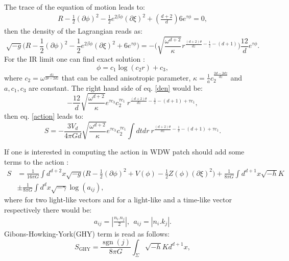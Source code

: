\documentclass[]{article}
\DeclareMathOperator{\sgn}{sgn}
\begin{document}
The trace of the equation of motion leads to:
\begin{align}
R-\frac{1}{2}(\partial \phi)^2-\frac{1}{2}e^{2\beta \phi}(\partial \xi)^2+(\frac{d+2}{d})6e^{\tau \phi}=0,
\end{align}
then the density of the Lagrangian reads as:
\begin{equation}
\sqrt{-g}\Big(R-\frac{1}{2}(\partial \phi)^2-\frac{1}{2}e^{2\beta \phi}(\partial \xi)^2+6e^{\tau \phi}\Big)=-\Big(\sqrt{\frac{\omega^{d+2}}{\kappa}}r^{\frac{(d+2)\theta}{dz}-\frac{1}{z}-(d+1)}\Big)\frac{12}{d}e^{\tau \phi}. \label{den}
\end{equation}
For the IR limit one can find exact solution \cite{strong}:
\begin{equation}
\phi=c_1 \log (c_2 r)+c_3, \label{dilaton}
\end{equation}
where $c_2=\omega^{\frac{dz}{2\theta-2dz}}$ that can be called anisotropic parameter, $\kappa=\frac{1}{a}c_2^{\frac{2d-2dz}{dz}}$ and $a,c_1,c_3$ are constant. The right hand side of eq. \eqref{den} would be:
\begin{equation}
-\frac{12}{d}\sqrt{\frac{\omega^{d+2}}{\kappa}}e^{\tau c_3} c_2^{\tau c_1}~ r^{\frac{(d+2)\theta}{dz}-\frac{1}{z}-(d+1)+\tau c_1},
\end{equation}
then eq. \eqref{action} leads to:
\begin{equation}
S=-\frac{3V_d}{4\pi Gd}\sqrt{\frac{\omega^{d+2}}{\kappa}}e^{\tau c_3} c_2^{\tau c_1} \int  dt dr~ r^{\frac{(d+2)\theta}{dz}-\frac{1}{z}-(d+1)+\tau c_1}. \label{reform}
\end{equation}

If one is interested in computing the action in WDW patch should add some terms to the action \cite{pad,myersnul}:
\begin{equation}
\begin{aligned}
S&=\frac{1}{16\pi G}\int d^{d+2}x \sqrt{-g}\Big(R-\frac{1}{2}(\partial \phi)^2+V(\phi)-\frac{1}{2}Z(\phi)(\partial \xi)^2\Big)+\frac{1}{8\pi G}\int d^{d+1}x \sqrt{-h}K \\
& \pm \frac{1}{8\pi G}\int d^dx \sqrt{-\gamma} \log (a_{ij}), \label{wdw}
\end{aligned}
\end{equation}
where for two light-like vectors and for a light-like and a time-like vector respectively there would be: 
\begin{align}
a_{ij}=|\frac{n_i.n_j}{2}|,~~a_{ij}=|n_i.k_j|.
\end{align}
Gibons-Howking-York(GHY) term is read as follows:
\begin{equation}
S_{\text{GHY}}=\frac{\sgn(j)}{8\pi G}\int_{\Sigma}\sqrt{-h}Kd^{d+1}x, \label{ghy}
\end{equation}
\end{document}
